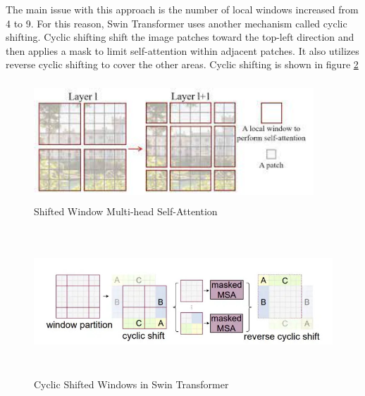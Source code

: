 The main issue with this approach is the number of local windows increased from 4 to 9. For this reason, Swin Transformer uses another mechanism called cyclic shifting. Cyclic shifting shift the image patches toward the top-left direction and then applies a mask to limit self-attention within adjacent patches. It also utilizes reverse cyclic shifting to cover the other areas. Cyclic shifting is shown in figure \ref{fig:swin cyclic}
\begin{figure}[ht]
\includegraphics[width=10.5cm, height=4.5cm]{images/swin-msa1.jpeg}
\centering
\caption{Shifted Window Multi-head Self-Attention \protect\cite{swin-v1}}
\label{fig:swin shifted}
\end{figure}

\begin{figure}[ht]
\includegraphics[width=13.5cm, height=5.5cm]{images/swin-cyclic-shift.jpg}
\centering
\caption{Cyclic Shifted Windows in Swin Transformer \protect\cite{swin-v1}}
\label{fig:swin cyclic}
\end{figure}

\FloatBarrier

